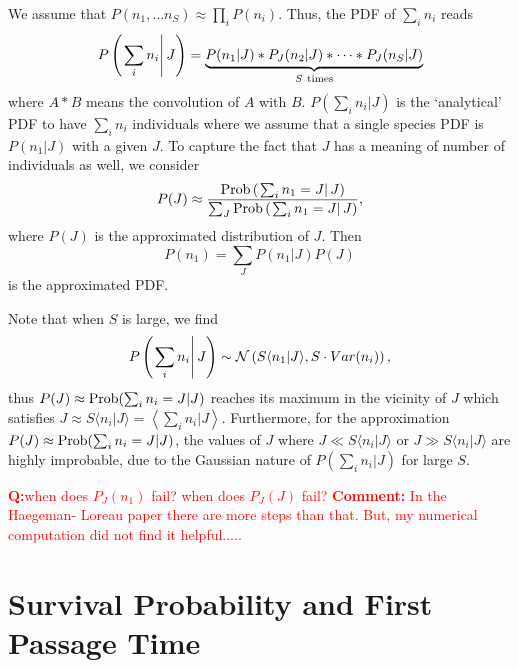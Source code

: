 \documentclass[%
 amsmath,amssymb,
 reprint,%
]{revtex4-2}
\begin{document}
\begin{widetext}
We assume that $P(n_1,\dots n_S) \approx \prod_i P(n_i)$. Thus, the PDF of $\sum_i n_i$ reads 
\begin{equation}
    P\left(\left.\sum_i n_i\right|J\right)=\underbrace{P(n_1|J)*P_J(n_2|J)* \dots * P_J(n_S|J)}_{S {\rm \ times}}
\end{equation}
where $A*B$ means the convolution of $A$ with $B$. $P\left(\sum_i n_i|J\right)$ is the `analytical' PDF to have $\sum_i n_i$ individuals where we assume that a single species PDF is $P(n_1|J)$ with a given $J$. 
To capture the fact that $J$ has a meaning of number of individuals as well, we consider
\begin{equation}
    P(J)\approx \frac{{\rm Prob}\left(\left.\sum_i n_1=J\right|J\right)}{\sum_J {\rm Prob}\left(\left.\sum_i n_1=J\right|J\right)},
\end{equation}
where $P(J)$ is the approximated distribution of $J$. 
Then
\begin{equation}
    P(n_1) = \sum_{J}P(n_1|J) P(J)
\end{equation}
is the approximated PDF. 

Note that when $S$ is large, we find
\begin{equation}
    P\left(\left.\sum_i n_i\right|J\right) \sim  {\cal N}\left(S\langle n_1 |J \rangle, S \cdot Var(n_i) \right),
\end{equation}
thus $P(J)\approx {\rm Prob}(\sum_i n_i =J|J)$ reaches its maximum in the vicinity of $J$ which satisfies $J\approx S \langle n_i |J \rangle = \left\langle \sum_i n_i |J \right\rangle $. Furthermore, for the approximation $P(J)\approx {\rm Prob}(\sum_i n_i =J|J)$, the values of $J$ where $J\ll S\langle n_i |J \rangle  $ or $J\gg S\langle n_i |J \rangle $ are highly improbable, due to the Gaussian nature of $P(\sum_i n_i|J)$ for large $S$.


\textcolor{red}{{\bf Q:}when does $P_J(n_1)$ fail? when does $P_J(J)$ fail? {\bf Comment:} In the Haegeman- Loreau paper \cite{Haegeman2011} there are more steps than that. But, my numerical computation did not find it helpful..... }





\section{Survival Probability and First Passage Time }


\end{widetext}
\end{document}
